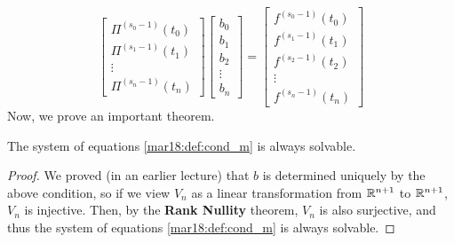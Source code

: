 \begin{equation}
  \label{mar18:def:cond_m}
  \begin{bmatrix}
    \Pi^{(s_0 - 1)}(t_0) \\
    \Pi^{(s_1 - 1)}(t_1) \\
    \vdots \\
    \Pi^{(s_n - 1)}(t_n)
  \end{bmatrix}
  \begin{bmatrix}b_0 \\ b_1 \\ b_2 \\ \vdots \\ b_n \end{bmatrix}
  =
  \begin{bmatrix}f^{(s_0 - 1)}(t_0) \\ f^{(s_1 - 1)}(t_1) \\ f^{(s_2 - 1)}(t_2) \\ \vdots \\ f^{(s_n - 1)}(t_n) \end{bmatrix}
\end{equation}
Now, we prove an important theorem.
\begin{thm}
  The system of equations \ref{mar18:def:cond_m} is always solvable.
\end{thm}
\begin{proof}
  We proved (in an earlier lecture) that $b$ is determined uniquely by the above condition, so if we view $V_n$ as a linear transformation from $\mathbb{R}^{n+1}$ to $\mathbb{R}^{n+1}$, $V_n$ is injective. Then, by the \textbf{Rank Nullity} theorem, $V_n$ is also surjective, and thus the system of equations \ref{mar18:def:cond_m} is always solvable.
  \hfill
\end{proof}

